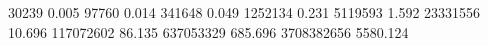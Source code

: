 30239      0.005
97760      0.014
341648     0.049
1252134    0.231
5119593    1.592
23331556   10.696
117072602  86.135
637053329  685.696
3708382656 5580.124
